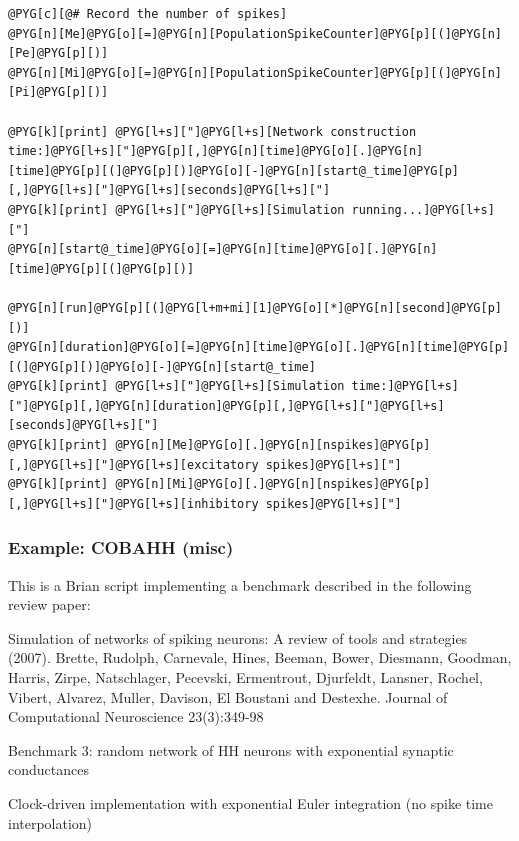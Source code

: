 \documentclass[letterpaper,10pt,english]{manual}
\begin{document}
\begin{Verbatim}[commandchars=@\[\]]
@PYG[c][@# Record the number of spikes]
@PYG[n][Me]@PYG[o][=]@PYG[n][PopulationSpikeCounter]@PYG[p][(]@PYG[n][Pe]@PYG[p][)]
@PYG[n][Mi]@PYG[o][=]@PYG[n][PopulationSpikeCounter]@PYG[p][(]@PYG[n][Pi]@PYG[p][)]

@PYG[k][print] @PYG[l+s]["]@PYG[l+s][Network construction time:]@PYG[l+s]["]@PYG[p][,]@PYG[n][time]@PYG[o][.]@PYG[n][time]@PYG[p][(]@PYG[p][)]@PYG[o][-]@PYG[n][start@_time]@PYG[p][,]@PYG[l+s]["]@PYG[l+s][seconds]@PYG[l+s]["]
@PYG[k][print] @PYG[l+s]["]@PYG[l+s][Simulation running...]@PYG[l+s]["]
@PYG[n][start@_time]@PYG[o][=]@PYG[n][time]@PYG[o][.]@PYG[n][time]@PYG[p][(]@PYG[p][)]

@PYG[n][run]@PYG[p][(]@PYG[l+m+mi][1]@PYG[o][*]@PYG[n][second]@PYG[p][)]
@PYG[n][duration]@PYG[o][=]@PYG[n][time]@PYG[o][.]@PYG[n][time]@PYG[p][(]@PYG[p][)]@PYG[o][-]@PYG[n][start@_time]
@PYG[k][print] @PYG[l+s]["]@PYG[l+s][Simulation time:]@PYG[l+s]["]@PYG[p][,]@PYG[n][duration]@PYG[p][,]@PYG[l+s]["]@PYG[l+s][seconds]@PYG[l+s]["]
@PYG[k][print] @PYG[n][Me]@PYG[o][.]@PYG[n][nspikes]@PYG[p][,]@PYG[l+s]["]@PYG[l+s][excitatory spikes]@PYG[l+s]["]
@PYG[k][print] @PYG[n][Mi]@PYG[o][.]@PYG[n][nspikes]@PYG[p][,]@PYG[l+s]["]@PYG[l+s][inhibitory spikes]@PYG[l+s]["]
\end{Verbatim}

\resetcurrentobjects
\hypertarget{--doc-examples-misc_COBAHH}{}

\hypertarget{index-33}{}\subsubsection{Example: COBAHH (misc)}

This is a Brian script implementing a benchmark described
in the following review paper:

Simulation of networks of spiking neurons: A review of tools and strategies (2007).
Brette, Rudolph, Carnevale, Hines, Beeman, Bower, Diesmann, Goodman, Harris, Zirpe,
Natschlager, Pecevski, Ermentrout, Djurfeldt, Lansner, Rochel, Vibert, Alvarez, Muller,
Davison, El Boustani and Destexhe.
Journal of Computational Neuroscience 23(3):349-98

Benchmark 3: random network of HH neurons with exponential synaptic conductances

Clock-driven implementation with exponential Euler integration
(no spike time interpolation)
\end{document}
